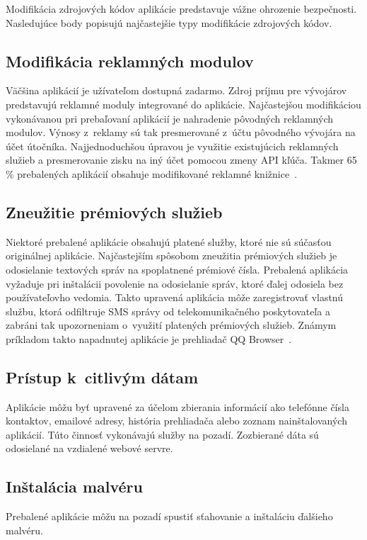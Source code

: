 Modifikácia zdrojových kódov aplikácie predstavuje vážne ohrozenie bezpečnosti. Nasledujúce body popisujú najčastejšie typy modifikácie zdrojových kódov.

\subsection*{Modifikácia reklamných modulov}
Väčšina aplikácií je užívateľom dostupná zadarmo. Zdroj príjmu pre vývojárov predstavujú reklamné moduly integrované do aplikácie. Najčastejšou modifikáciou vykonávanou pri prebaľovaní aplikácií je nahradenie pôvodných reklamných modulov. Výnosy z~reklamy sú tak presmerované z~účtu pôvodného vývojára na účet útočníka. Najjednoduchšou úpravou je využitie existujúcich reklamných služieb a presmerovanie zisku na iný účet pomocou zmeny API kľúča. Takmer 65 \% prebalených aplikácií obsahuje modifikované reklamné knižnice~\cite{fakeapps}.

\subsection*{Zneužitie prémiových služieb}
Niektoré prebalené aplikácie obsahujú platené služby, ktoré nie sú súčasťou originálnej aplikácie. Najčastejším spôsobom zneužitia prémiových služieb je odosielanie textových správ na spoplatnené prémiové čísla. Prebalená aplikácia vyžaduje pri inštalácii povolenie na odosielanie správ, ktoré ďalej odosiela bez používateľovho vedomia. Takto upravená aplikácia môže zaregistrovať vlastnú službu, ktorá odfiltruje SMS správy od telekomunikačného poskytovateľa a zabráni tak upozorneniam o~využití platených prémiových služieb. Známym príkladom takto napadnutej aplikácie je prehliadač QQ Browser~\cite{fakeapps}.

\subsection*{Prístup k~citlivým dátam}
Aplikácie môžu byť upravené za účelom zbierania informácií ako telefónne čísla kontaktov, emailové adresy, história prehliadača alebo zoznam nainštalovaných aplikácií. Túto činnosť vykonávajú služby na pozadí. Zozbierané dáta sú odosielané na vzdialené webové servre. 

\subsection*{Inštalácia malvéru}
Prebalené aplikácie môžu na pozadí spustiť sťahovanie a inštaláciu ďalšieho malvéru. 

